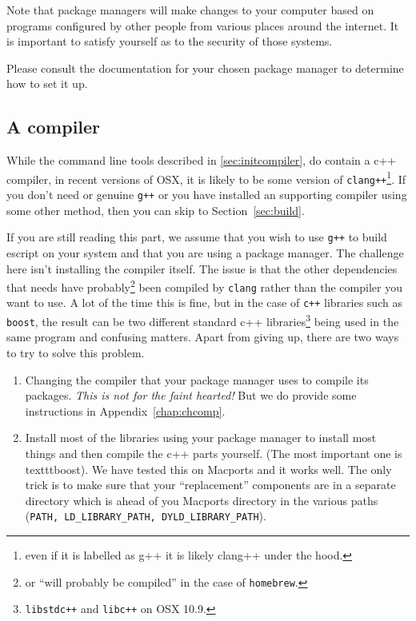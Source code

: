 Note that package managers will make changes to your computer based on programs configured by other people from 
various places around the internet.
It is important to satisfy yourself as to the security of those systems.

Please consult the documentation for your chosen package manager to determine how to set it up.

\subsection{A compiler}\label{sec:osxcompiler}
While the command line tools described in \ref{sec:initcompiler}, do contain a c++ compiler, in recent versions of OSX, 
it is likely to be some version of \texttt{clang++}\footnote{even if it is 
labelled as g++ it is likely clang++ under the hood.}.
If you don't need \openmp or genuine \texttt{g++} or you have installed an \openmp supporting compiler
using some other method, then you can skip to Section~\ref{sec:build}.

If you are still reading this part, we assume that you wish to use \texttt{g++} to build escript on your system and that you are 
using a package manager.
The challenge here isn't installing the compiler itself. 
The issue is that the other dependencies that \escript needs have 
probably\footnote{or ``will probably be compiled'' in the case of \texttt{homebrew}.} been compiled by \texttt{clang} rather than the compiler 
you want to use.
A lot of the time this is fine, but in the case of \texttt{c++} libraries such as \texttt{boost}, the result can be two different 
standard c++ libraries\footnote{\texttt{libstdc++} and \texttt{libc++} on OSX 10.9.} being used in the same program and confusing matters.
Apart from giving up, there are two ways to try to solve this problem.
\begin{enumerate}
\item Changing the compiler that your package manager uses to compile its packages.
\emph{This is not for the faint hearted!} But we do provide some instructions in Appendix~\ref{chap:chcomp}.
\item Install most of the libraries using your package manager to install most things and then compile the c++ parts yourself.
(The most important one is texttt{boost}).
We have tested this on Macports and it works well. The only trick is to make sure that your ``replacement'' components are in a separate 
directory which is ahead of you Macports directory in the various paths (\texttt{PATH, LD\_LIBRARY\_PATH, DYLD\_LIBRARY\_PATH}).
\end{enumerate}




